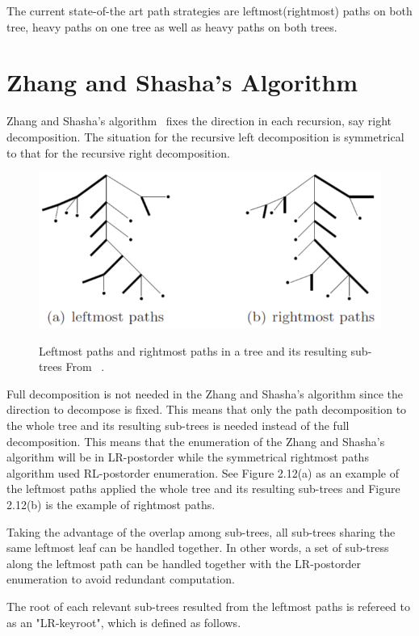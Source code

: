 The current state-of-the art path strategies are leftmost(rightmost) paths on both tree, heavy paths on one tree as well as heavy paths on both trees.

\section{Zhang and Shasha's Algorithm}

Zhang and Shasha's algorithm~\cite{zhang1989simple} fixes the direction in each recursion, say right decomposition. The situation for the recursive left decomposition is symmetrical to that for the recursive right decomposition. 

\begin{figure}
		\centering
		\includegraphics[width=12cm,clip]{Figures/LeftmostPathandRightmostPath}
		\label{Leftmost Paths and Rightmost Paths} 
		\caption{Leftmost paths and rightmost paths in a tree and its resulting sub-trees From ~\cite{Chen2014}.}
\end{figure}

Full decomposition is not needed in the Zhang and Shasha's algorithm since the direction to decompose is fixed. This means that only the path decomposition to the whole tree and its resulting sub-trees is needed instead of the full decomposition. This means that the enumeration of the Zhang and Shasha's algorithm will be in LR-postorder while the symmetrical rightmost paths algorithm used RL-postorder enumeration. See Figure 2.12(a) as an example of the leftmost paths applied the whole tree and its resulting sub-trees and Figure 2.12(b) is the example of rightmost paths.

Taking the advantage of the overlap among sub-trees, all sub-trees sharing the same leftmost leaf can be handled together. In other words, a set of sub-tress along the leftmost path can be handled together with the LR-postorder enumeration to avoid redundant computation.

The root of each relevant sub-trees resulted from the leftmost paths is refereed to as an "LR-keyroot", which is defined as follows.

